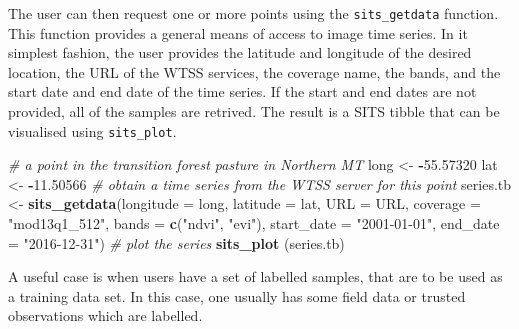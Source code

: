 \documentclass[11pt,]{article}
\newenvironment{Shaded}{\begin{snugshade}}{\end{snugshade}}
\newcommand{\KeywordTok}[1]{\textcolor[rgb]{0.13,0.29,0.53}{\textbf{#1}}}
\newcommand{\DataTypeTok}[1]{\textcolor[rgb]{0.13,0.29,0.53}{#1}}
\newcommand{\FloatTok}[1]{\textcolor[rgb]{0.00,0.00,0.81}{#1}}
\newcommand{\StringTok}[1]{\textcolor[rgb]{0.31,0.60,0.02}{#1}}
\newcommand{\CommentTok}[1]{\textcolor[rgb]{0.56,0.35,0.01}{\textit{#1}}}
\newcommand{\OperatorTok}[1]{\textcolor[rgb]{0.81,0.36,0.00}{\textbf{#1}}}
\newcommand{\NormalTok}[1]{#1}
\begin{document}
The user can then request one or more points using the
\texttt{sits\_getdata} function. This function provides a general means
of access to image time series. In it simplest fashion, the user
provides the latitude and longitude of the desired location, the URL of
the WTSS services, the coverage name, the bands, and the start date and
end date of the time series. If the start and end dates are not
provided, all of the samples are retrived. The result is a SITS tibble
that can be visualised using \texttt{sits\_plot}.

\begin{Shaded}
\begin{Highlighting}[]
\CommentTok{# a point in the transition forest pasture in Northern MT}
\NormalTok{long <-}\StringTok{ }\OperatorTok{-}\FloatTok{55.57320}
\NormalTok{lat <-}\StringTok{ }\OperatorTok{-}\FloatTok{11.50566}
\CommentTok{# obtain a time series from the WTSS server for this point}
\NormalTok{series.tb <-}\StringTok{ }\KeywordTok{sits_getdata}\NormalTok{(}\DataTypeTok{longitude =}\NormalTok{ long, }\DataTypeTok{latitude =}\NormalTok{ lat, }\DataTypeTok{URL =}\NormalTok{ URL, }
             \DataTypeTok{coverage =} \StringTok{"mod13q1_512"}\NormalTok{, }\DataTypeTok{bands =} \KeywordTok{c}\NormalTok{(}\StringTok{"ndvi"}\NormalTok{, }\StringTok{"evi"}\NormalTok{),}
             \DataTypeTok{start_date =} \StringTok{"2001-01-01"}\NormalTok{, }\DataTypeTok{end_date =} \StringTok{"2016-12-31"}\NormalTok{)}
\CommentTok{# plot the series}
\KeywordTok{sits_plot}\NormalTok{ (series.tb)}
\end{Highlighting}
\end{Shaded}

A useful case is when users have a set of labelled samples, that are to
be used as a training data set. In this case, one usually has some field
data or trusted observations which are labelled.
\newpage
\singlespacing

\end{document}
